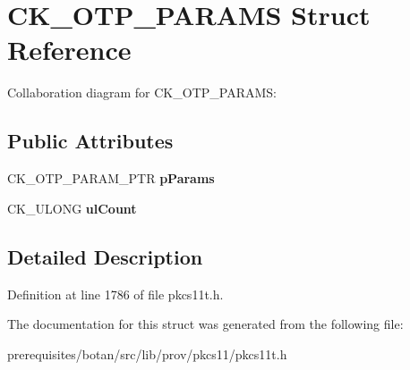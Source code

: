 \hypertarget{struct_c_k___o_t_p___p_a_r_a_m_s}{}\section{C\+K\+\_\+\+O\+T\+P\+\_\+\+P\+A\+R\+A\+MS Struct Reference}
\label{struct_c_k___o_t_p___p_a_r_a_m_s}


Collaboration diagram for C\+K\+\_\+\+O\+T\+P\+\_\+\+P\+A\+R\+A\+MS\+:
\subsection*{Public Attributes}
\begin{DoxyCompactItemize}
\item 
\mbox{\label{struct_c_k___o_t_p___p_a_r_a_m_s_a0c1c31bc572747df887a0f2fd470829b}} 
C\+K\+\_\+\+O\+T\+P\+\_\+\+P\+A\+R\+A\+M\+\_\+\+P\+TR {\bfseries p\+Params}
\item 
\mbox{\label{struct_c_k___o_t_p___p_a_r_a_m_s_add62565e22aa0a71327114091fbaa2d4}} 
C\+K\+\_\+\+U\+L\+O\+NG {\bfseries ul\+Count}
\end{DoxyCompactItemize}


\subsection{Detailed Description}


Definition at line 1786 of file pkcs11t.\+h.



The documentation for this struct was generated from the following file\+:\begin{DoxyCompactItemize}
\item 
prerequisites/botan/src/lib/prov/pkcs11/pkcs11t.\+h\end{DoxyCompactItemize}
